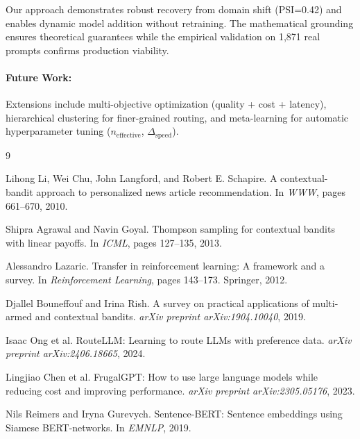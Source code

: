 \documentclass[sigconf]{acmart}
\begin{document}
Our approach demonstrates robust recovery from domain shift (PSI=0.42) and enables dynamic model addition without retraining. The mathematical grounding ensures theoretical guarantees while the empirical validation on 1,871 real prompts confirms production viability.

\paragraph{Future Work:} Extensions include multi-objective optimization (quality + cost + latency), hierarchical clustering for finer-grained routing, and meta-learning for automatic hyperparameter tuning ($n_{\text{effective}}$, $\Delta_{\text{speed}}$).


\begin{thebibliography}{9}

Lihong Li, Wei Chu, John Langford, and Robert E. Schapire.
\newblock A contextual-bandit approach to personalized news article recommendation.
\newblock In \emph{WWW}, pages 661--670, 2010.

Shipra Agrawal and Navin Goyal.
\newblock Thompson sampling for contextual bandits with linear payoffs.
\newblock In \emph{ICML}, pages 127--135, 2013.

Alessandro Lazaric.
\newblock Transfer in reinforcement learning: A framework and a survey.
\newblock In \emph{Reinforcement Learning}, pages 143--173. Springer, 2012.

Djallel Bouneffouf and Irina Rish.
\newblock A survey on practical applications of multi-armed and contextual bandits.
\newblock \emph{arXiv preprint arXiv:1904.10040}, 2019.

Isaac Ong et al.
\newblock RouteLLM: Learning to route LLMs with preference data.
\newblock \emph{arXiv preprint arXiv:2406.18665}, 2024.

Lingjiao Chen et al.
\newblock FrugalGPT: How to use large language models while reducing cost and improving performance.
\newblock \emph{arXiv preprint arXiv:2305.05176}, 2023.

Nils Reimers and Iryna Gurevych.
\newblock Sentence-BERT: Sentence embeddings using Siamese BERT-networks.
\newblock In \emph{EMNLP}, 2019.

\end{thebibliography}
\end{document}
